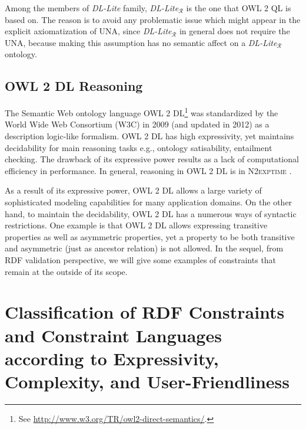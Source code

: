 \documentclass{llncs}
\newcommand{\tb}[1]{\todo[size=\small, color=green!40]{\textbf{Thomas:} #1}}
\begin{document}
Among the members of \textit{DL-Lite} family, \textit{DL-Lite}$_\mathcal{R}$ is the one that OWL 2 QL is based on. The reason is to avoid any problematic issue which might appear in the explicit axiomatization of UNA, since  \textit{DL-Lite}$_\mathcal{R}$ in general does not require the UNA, because making this assumption has no semantic affect on a \textit{DL-Lite}$_\mathcal{R}$ ontology.

\subsection{OWL 2 DL Reasoning}


The Semantic Web ontology language OWL 2 DL\footnote{See \url{http://www.w3.org/TR/owl2-direct-semantics/}.} was standardized by
the World Wide Web Consortium (W3C) in 2009 (and updated in 2012) as a
description logic-like formalism.  OWL 2 DL has high expressivity, yet maintains  decidability for main reasoning tasks e.g., ontology satisability, 
entailment checking. The drawback of its expressive power results as a lack of computational efficiency in performance. In general, reasoning in OWL 2 DL is in \textsc{N2exptime} \cite{owl2profiles2008}. 

As a result of its expressive power, OWL 2 DL allows a large variety of sophisticated modeling capabilities for many application domains.  On the other hand, to maintain the decidability, OWL 2 DL has a numerous ways of syntactic restrictions. One example is that OWL 2 DL allows  expressing transitive properties as well as asymmetric properties, yet a property to be both transitive and asymmetric (just as ancestor relation) is not allowed. In the sequel, from RDF validation perspective, we will give some examples of constraints that remain at the outside of its scope. 

\section{Classification of RDF Constraints and Constraint Languages according to Expressivity, Complexity, and User-Friendliness}

\end{document}
